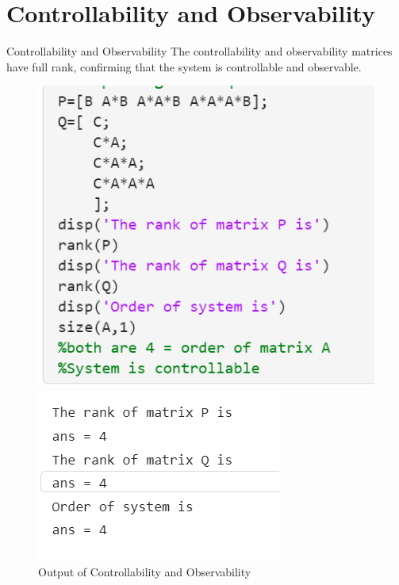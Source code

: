\documentclass[10pt,compress,mathserif]{beamer}
\begin{document}
\section{Controllability and Observability}
\begin{frame}{Controllability and Observability}
The controllability and observability matrices have full rank, confirming that the system is controllable and observable.
\begin{figure}[h!]
    \centering
    \begin{minipage}{0.45\textwidth}
        \centering
        \includegraphics[width=\textwidth]{rank.png}
        \caption{Code for Controllability and Observability}
    \end{minipage}
    \hfill
    \begin{minipage}{0.45\textwidth}
        \centering
        \includegraphics[width=\textwidth]{rank_output.png}
        \caption{Output of Controllability and Observability}
    \end{minipage}
\end{figure}
\end{frame}
\end{document}

